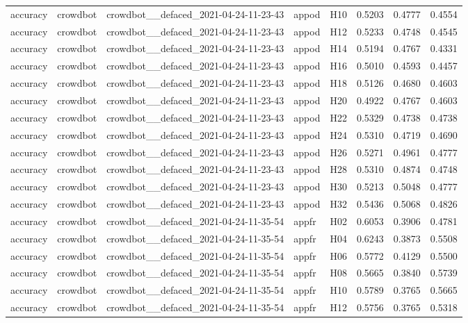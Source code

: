 \begin{table}[tbp]
\begin{tabular}{lllllrrr}
accuracy & crowdbot & crowdbot\_\_defaced\_2021-04-24-11-23-43 & appod & H10 & 0.5203 & 0.4777 & 0.4554 \\
accuracy & crowdbot & crowdbot\_\_defaced\_2021-04-24-11-23-43 & appod & H12 & 0.5233 & 0.4748 & 0.4545 \\
accuracy & crowdbot & crowdbot\_\_defaced\_2021-04-24-11-23-43 & appod & H14 & 0.5194 & 0.4767 & 0.4331 \\
accuracy & crowdbot & crowdbot\_\_defaced\_2021-04-24-11-23-43 & appod & H16 & 0.5010 & 0.4593 & 0.4457 \\
accuracy & crowdbot & crowdbot\_\_defaced\_2021-04-24-11-23-43 & appod & H18 & 0.5126 & 0.4680 & 0.4603 \\
accuracy & crowdbot & crowdbot\_\_defaced\_2021-04-24-11-23-43 & appod & H20 & 0.4922 & 0.4767 & 0.4603 \\
accuracy & crowdbot & crowdbot\_\_defaced\_2021-04-24-11-23-43 & appod & H22 & 0.5329 & 0.4738 & 0.4738 \\
accuracy & crowdbot & crowdbot\_\_defaced\_2021-04-24-11-23-43 & appod & H24 & 0.5310 & 0.4719 & 0.4690 \\
accuracy & crowdbot & crowdbot\_\_defaced\_2021-04-24-11-23-43 & appod & H26 & 0.5271 & 0.4961 & 0.4777 \\
accuracy & crowdbot & crowdbot\_\_defaced\_2021-04-24-11-23-43 & appod & H28 & 0.5310 & 0.4874 & 0.4748 \\
accuracy & crowdbot & crowdbot\_\_defaced\_2021-04-24-11-23-43 & appod & H30 & 0.5213 & 0.5048 & 0.4777 \\
accuracy & crowdbot & crowdbot\_\_defaced\_2021-04-24-11-23-43 & appod & H32 & 0.5436 & 0.5068 & 0.4826 \\
accuracy & crowdbot & crowdbot\_\_defaced\_2021-04-24-11-35-54 & appfr & H02 & 0.6053 & 0.3906 & 0.4781 \\
accuracy & crowdbot & crowdbot\_\_defaced\_2021-04-24-11-35-54 & appfr & H04 & 0.6243 & 0.3873 & 0.5508 \\
accuracy & crowdbot & crowdbot\_\_defaced\_2021-04-24-11-35-54 & appfr & H06 & 0.5772 & 0.4129 & 0.5500 \\
accuracy & crowdbot & crowdbot\_\_defaced\_2021-04-24-11-35-54 & appfr & H08 & 0.5665 & 0.3840 & 0.5739 \\
accuracy & crowdbot & crowdbot\_\_defaced\_2021-04-24-11-35-54 & appfr & H10 & 0.5789 & 0.3765 & 0.5665 \\
accuracy & crowdbot & crowdbot\_\_defaced\_2021-04-24-11-35-54 & appfr & H12 & 0.5756 & 0.3765 & 0.5318 \\

\end{tabular}
\end{table}
